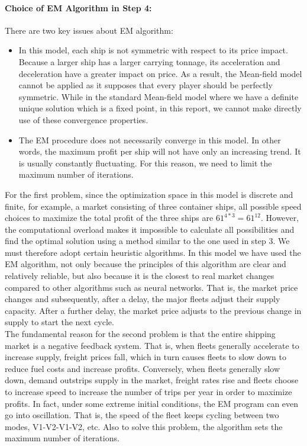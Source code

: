 \documentclass[a4paper,12pt]{article}
\begin{document}
\paragraph{Choice of EM Algorithm in Step 4:}

There are two key issues about EM algorithm:
\begin{itemize}
	\item In this model, each ship is not symmetric with respect to its price impact. Because a larger ship has a larger carrying tonnage, its acceleration and deceleration have a greater impact on price. As a result, the Mean-field model cannot be applied as it supposes that every player should be perfectly symmetric. While in the standard Mean-field model where we have a definite unique solution which is a fixed point, in this report, we cannot make directly use of these convergence properties.
	\item The EM procedure does not necessarily converge in this model. In other words, the maximum profit per ship will not have only an increasing trend. It is usually constantly fluctuating. For this reason, we need to limit the maximum number of iterations.
\end{itemize}

For the first problem, since the optimization space in this model is discrete and finite, for example, a market consisting of three container ships, all possible speed choices to maximize the total profit of the three ships are $61^{4*3} = 61^{12}$.
However, the computational overload makes it impossible to calculate all possibilities and find the optimal solution using a method similar to the one used in step 3.
We must therefore adopt certain heuristic algorithms.
In this model we have used the EM algorithm, not only because the principles of this algorithm are clear and relatively reliable, but also because it is the closest to real market changes compared to other algorithms such as neural networks.
That is, the market price changes and subsequently, after a delay, the major fleets adjust their supply capacity.
After a further delay, the market price adjusts to the previous change in supply to start the next cycle.\\

The fundamental reason for the second problem is that the entire shipping market is a negative feedback system.
That is, when fleets generally accelerate to increase supply, freight prices fall, which in turn causes fleets to slow down to reduce fuel costs and increase profits.
Conversely, when fleets generally slow down, demand outstrips supply in the market, freight rates rise and fleets choose to increase speed to increase the number of trips per year in order to maximize profits.
In fact, under some extreme initial conditions, the EM program can even go into oscillation. That is, the speed of the fleet keeps cycling between two modes, V1-V2-V1-V2, etc.
Also to solve this problem, the algorithm sets the maximum number of iterations.
\end{document}
